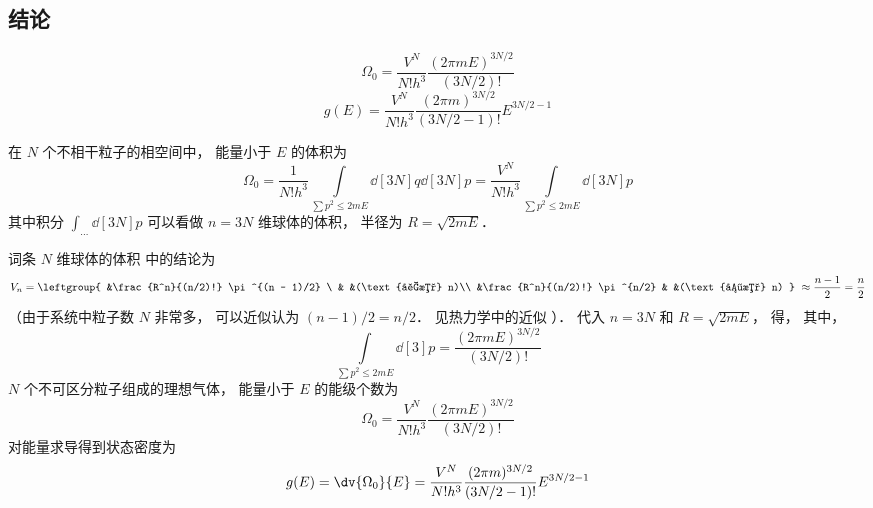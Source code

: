 
\subsection{结论}
\begin{equation}
\Omega_0 = \frac{V^N}{N! h^3} \frac{(2\pi mE)^{3N/2}}{(3N/2)!}
\end{equation}
\begin{equation}
g(E) = \frac{V^N}{N! h^3} \frac{(2\pi m)^{3N/2}}{(3N/2-1)!} E^{3N/2 - 1}
\end{equation}

在 $N$ 个不相干粒子的相空间中， 能量小于 $E$ 的体积为
\begin{equation}
\Omega_0 = \frac{1}{N! h^3} \int\limits_{\sum p^2 \le 2mE} \dd[3N]{q} \dd[3N]{p} = \frac{V^N}{N! h^3} \int\limits_{\sum p^2 \le 2mE} \dd[3N]{p}
\end{equation}
其中积分 $\int_{\dots} \dd[3N]{p} $ 可以看做 $n=3N$ 维球体的体积， 半径为 $R = \sqrt{2mE}$． 

词条 $N$ 维球体的体积%
中的结论为 
\begin{equation}
V_n = \leftgroup{
&\frac{R^n}{(n/2)!} \pi^{(n - 1)/2} \ & &(\text{奇数} n)\\
&\frac{R^n}{(n/2)!} \pi^{n/2}  & &(\text{偶数} n)
} \ \approx \frac{n - 1}{2} = \frac{n}{2}
\end{equation}
（由于系统中粒子数 $N$ 非常多， 可以近似认为 $(n - 1)/2 = n/2$．  见热力学中的近似%
）． 代入 $n=3N$ 和 $R = \sqrt{2mE} $，   得， %
其中，
\begin{equation}
\int\limits_{\sum p^2 \le 2mE} \dd[3]{p} = \frac{(2\pi mE)^{3N/2}}{(3N/2)!}
\end{equation}
$N$ 个不可区分粒子组成的理想气体， 能量小于 $E$ 的能级个数为
\begin{equation}
\Omega_0 = \frac{V^N}{N! h^3} \frac{(2\pi mE)^{3N/2}}{(3N/2)!}
\end{equation}
对能量求导得到状态密度为
\begin{equation}
g(E) = \dv{\Omega_0}{E} = \frac{V^N}{N! h^3} \frac{(2\pi m)^{3N/2}}{(3N/2 - 1)!} E^{3N/2 - 1}
\end{equation}
